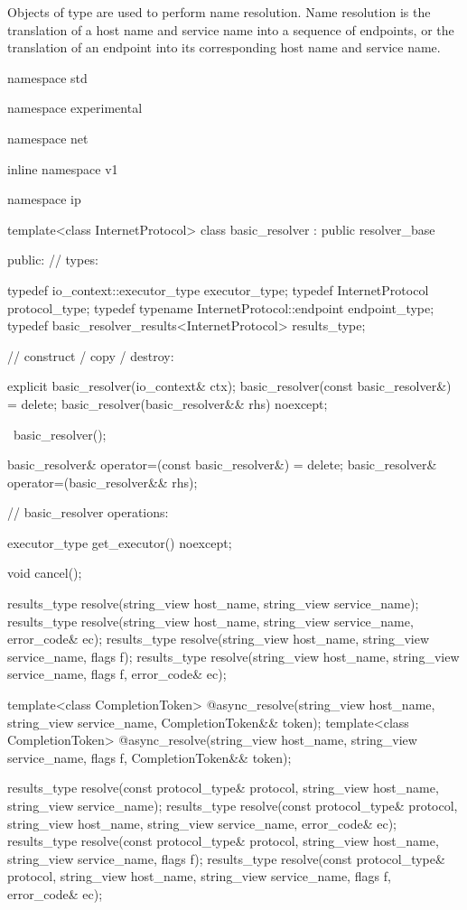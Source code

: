 \pnum
Objects of type  are used to perform name resolution. Name resolution is the translation of a host name and service name into a sequence of endpoints, or the translation of an endpoint into its corresponding host name and service name.

\begin{codeblock}
namespace std {
namespace experimental {
namespace net {
inline namespace v1 {
namespace ip {

  template<class InternetProtocol>
  class basic_resolver : public resolver_base
  {
  public:
    // types:

    typedef io_context::executor_type executor_type;
    typedef InternetProtocol protocol_type;
    typedef typename InternetProtocol::endpoint endpoint_type;
    typedef basic_resolver_results<InternetProtocol> results_type;

    // construct / copy / destroy:

    explicit basic_resolver(io_context& ctx);
    basic_resolver(const basic_resolver&) = delete;
    basic_resolver(basic_resolver&& rhs) noexcept;

    ~basic_resolver();

    basic_resolver& operator=(const basic_resolver&) = delete;
    basic_resolver& operator=(basic_resolver&& rhs);

    // basic_resolver operations:

    executor_type get_executor() noexcept;

    void cancel();

    results_type resolve(string_view host_name, string_view service_name);
    results_type resolve(string_view host_name, string_view service_name,
                         error_code& ec);
    results_type resolve(string_view host_name, string_view service_name,
                         flags f);
    results_type resolve(string_view host_name, string_view service_name,
                         flags f, error_code& ec);

    template<class CompletionToken>
      @\DEDUCED@ async_resolve(string_view host_name, string_view service_name,
                            CompletionToken&& token);
    template<class CompletionToken>
      @\DEDUCED@ async_resolve(string_view host_name, string_view service_name,
                            flags f, CompletionToken&& token);

    results_type resolve(const protocol_type& protocol,
                         string_view host_name, string_view service_name);
    results_type resolve(const protocol_type& protocol,
                         string_view host_name, string_view service_name,
                         error_code& ec);
    results_type resolve(const protocol_type& protocol,
                         string_view host_name, string_view service_name,
                         flags f);
    results_type resolve(const protocol_type& protocol,
                         string_view host_name, string_view service_name,
                         flags f, error_code& ec);

}}}}}}
\end{codeblock}
